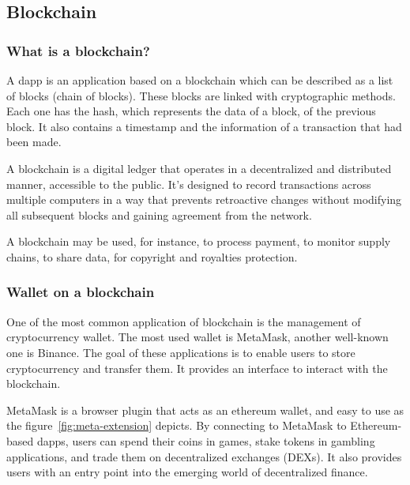 \documentclass{iitFirstPage}
\begin{document}
    \subsection{Blockchain}
    
    \subsubsection{What is a blockchain?}

    A \Gls{dapp} is an application based on a \gls{blockchain} which can be described as a list of blocks (chain of blocks).
    These blocks are linked with cryptographic methods.
    Each one has the hash, which represents the data of a block, of the previous block.
    It also contains a timestamp and the information of a transaction that had been made.

    A blockchain is a digital ledger that operates in a decentralized and distributed manner, accessible to the public.
    It's designed to record transactions across multiple computers in a way that prevents retroactive changes without modifying all subsequent blocks and gaining agreement from the network.
    
    A blockchain may be used, for instance, to process payment, to monitor supply chains, to share data, for copyright and royalties protection.

    \subsubsection{Wallet on a blockchain}

    One of the most common application of \gls{blockchain} is the management of cryptocurrency wallet.
    The most used wallet is MetaMask, another well-known one is Binance.
    The goal of these applications is to enable users to store cryptocurrency and transfer them.
    It provides an interface to interact with the blockchain.

    \clearpage

    MetaMask is a browser plugin that acts as an \Gls{ethereum} wallet, and easy to use as the figure~\ref{fig:meta-extension} depicts.
    By connecting to MetaMask to Ethereum-based \Glspl{dapp}, users can spend their coins in games, stake tokens in gambling applications, and trade them on decentralized exchanges (DEXs).
    It also provides users with an entry point into the emerging world of decentralized finance.
\end{document}
